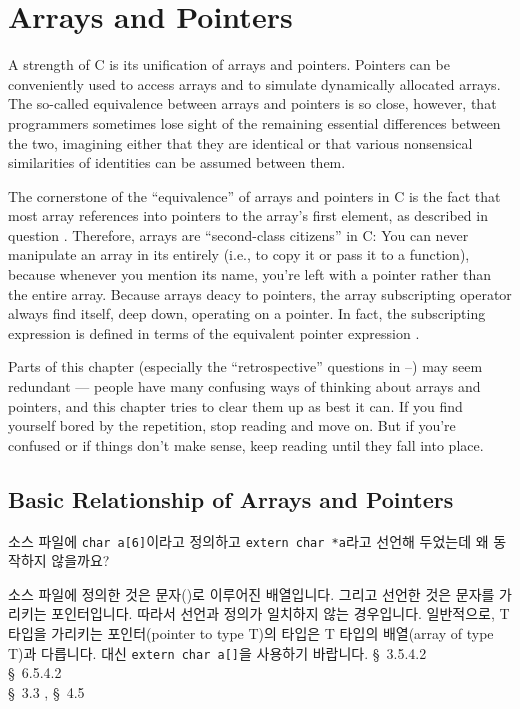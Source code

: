 \chapter{Arrays and Pointers}	\label{chap:arrayptr}

A strength of C is its unification of arrays and pointers.
Pointers can be conveniently used to access arrays and to simulate dynamically
allocated arrays.  The so-called equivalence between arrays and pointers is
so close, however, that programmers sometimes lose sight of the remaining
essential differences between the two, imagining either that they are
identical or that various nonsensical similarities of identities can be
assumed between them.

The cornerstone of the ``equivalence'' of arrays and pointers in C is the
fact that most array references  into pointers to the array's first
element, as described in question .  Therefore, arrays are
``second-class citizens'' in C: You can never manipulate an array in its
entirely (i.e., to copy it or pass it to a function), because whenever you
mention its name,
you're left with a pointer rather than the entire array. Because arrays
deacy to pointers, the array subscripting operator \TT{[]} always find itself,
deep down, operating on a pointer. In fact, the subscripting expression
 is defined in terms of the equivalent pointer expression
.

Parts of this chapter (especially the ``retrospective'' questions in 
--) may seem redundant --- people have many confusing ways of thinking
about arrays and pointers, and this chapter tries to clear them up as best
it can. If you find yourself bored by the repetition, stop reading and move on.
But if you're confused or if things don't make sense, keep reading until
they fall into place.

\section{Basic Relationship of Arrays and Pointers}
\begin{faq}
	소스 파일에 \verb+char a[6]+이라고 정의하고
        \verb+extern char *a+라고
	선언해 두었는데 왜 동작하지 않을까요?

\A
	소스 파일에 정의한 것은 문자()로 이루어진 배열입니다.  그리고
	선언한 것은 문자를 가리키는 포인터입니다.  따라서 선언과 정의가
	일치하지 않는 경우입니다.  일반적으로, T 타입을 가리키는 포인터(pointer to
	type T)의 타입은 T 타입의 배열(array of type T)과 다릅니다.
	대신 \verb+extern char a[]+을 사용하기 바랍니다.
\R
	\cite{ansi} \S\ 3.5.4.2 \\
	\cite{c89} \S\ 6.5.4.2 \\
	\cite{ctp} \S\ 3.3 , \S\ 4.5 
\end{faq}

